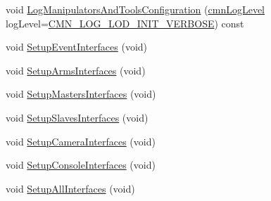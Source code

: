 \begin{DoxyCompactItemize}
\item 
void \hyperlink{classmts_intuitive_da_vinci_a82c5afa2ac835b951fbd9bccdece5e7d}{Log\+Manipulators\+And\+Tools\+Configuration} (\hyperlink{cmn_log_lo_d_8h_a70c67165c37a0971e0dd1a85d4edaaae}{cmn\+Log\+Level} log\+Level=\hyperlink{cmn_log_lo_d_8h_a019ecc9e1487050d540772de22800f44}{C\+M\+N\+\_\+\+L\+O\+G\+\_\+\+L\+O\+D\+\_\+\+I\+N\+I\+T\+\_\+\+V\+E\+R\+B\+O\+S\+E}) const 
\end{DoxyCompactItemize}
{\bf }\par
\begin{DoxyCompactItemize}
\item 
void \hyperlink{classmts_intuitive_da_vinci_a054e0b8026c6b3dd5687a4fee483e90c}{Setup\+Event\+Interfaces} (void)
\item 
void \hyperlink{classmts_intuitive_da_vinci_a8aeffb95c89efb86cd572f44017f7ae7}{Setup\+Arms\+Interfaces} (void)
\item 
void \hyperlink{classmts_intuitive_da_vinci_acb63524cb2eb5b30b43316ab5afe03af}{Setup\+Masters\+Interfaces} (void)
\item 
void \hyperlink{classmts_intuitive_da_vinci_acf772730a5e12199341cbf1a369e7fb9}{Setup\+Slaves\+Interfaces} (void)
\item 
void \hyperlink{classmts_intuitive_da_vinci_ad9912a22c4eea6d1bac867728e0c492f}{Setup\+Camera\+Interfaces} (void)
\item 
void \hyperlink{classmts_intuitive_da_vinci_a5481bd6861ce379fa3d81a2c71812d89}{Setup\+Console\+Interfaces} (void)
\item 
void \hyperlink{classmts_intuitive_da_vinci_ac2945537490e01f890dd3496c21129ab}{Setup\+All\+Interfaces} (void)
\end{DoxyCompactItemize}

